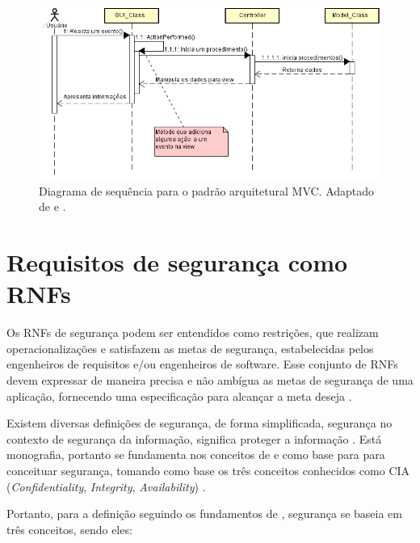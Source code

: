 \begin{figure}[h!]
	\centering
	\includegraphics[keepaspectratio=true,scale=0.8]{figuras/DiagramaDeSequenciaMVC.PNG}
	\caption{Diagrama de sequência para o padrão arquitetural MVC. Adaptado de \cite{durelli2008proposta} e \cite{buschmann1996system}.}
	\label{DiagramaDeSequenciaMVC}
\end{figure}

\pagebreak

\section{Requisitos de segurança como RNFs}
\label{sec:seguranca}

Os RNFs de segurança podem ser entendidos como restrições, que realizam operacionalizações e satisfazem as metas de segurança, estabelecidas pelos engenheiros de requisitos e/ou engenheiros de software. Esse conjunto de  RNFs devem expressar de maneira precisa e não ambígua as metas de segurança de uma aplicação, fornecendo uma especificação para alcançar a meta deseja \cite{haley2006framework}.  

Existem diversas definições de segurança, de forma simplificada, segurança no contexto de segurança da informação, significa proteger a informação \cite{chung2012non}. Está monografia, portanto se fundamenta nos conceitos de \cite{chung2012non} e \cite{sullivan2011web} como base para para conceituar segurança, tomando como base os três conceitos conhecidos como CIA (\textit{Confidentiality}, \textit{Integrity}, \textit{Availability}) . 

Portanto, para a definição seguindo os fundamentos de \cite{chung2012non}, segurança se baseia em três conceitos, sendo eles: 

